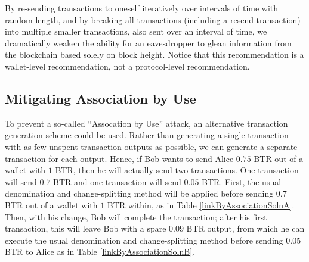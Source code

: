 \documentclass[12pt,english]{mrl}
\theoremstyle{definition}
\numberwithin{equation}{section}
\numberwithin{figure}{section}
\numberwithin{equation}{section}
\numberwithin{equation}{section}
\numberwithin{figure}{section}
\begin{document}
By re-sending transactions to oneself iteratively over intervals of time with random length, and by breaking all transactions (including a resend transaction) into multiple smaller transactions, also sent over an interval of time, we dramatically weaken the ability for an eavesdropper to glean information from the blockchain based solely on block height. Notice that this recommendation is a wallet-level recommendation, not a protocol-level recommendation.

\subsection{Mitigating Association by Use}\label{mitigAssoc}

To prevent a so-called ``Assocation by Use'' attack, an alternative transaction generation scheme could be used. Rather than generating a single transaction with as few unspent transaction outputs as possible, we can generate a separate transaction for each output. Hence, if Bob wants to send Alice $0.75$ BTR out of a wallet with $1$ BTR, then he will actually send two transactions. One transaction will send $0.7$ BTR and one transaction will send $0.05$ BTR.  First, the usual denomination and change-splitting method will be applied before sending $0.7$ BTR out of a wallet with $1$ BTR within, as in Table \ref{linkByAssociationSolnA}. Then, with his change, Bob will complete the transaction; after his first transaction, this will leave Bob with a spare $0.09$ BTR output, from which he can execute the usual denomination and change-splitting method before sending $0.05$ BTR to Alice as in Table \ref{linkByAssociationSolnB}.
\end{document}
